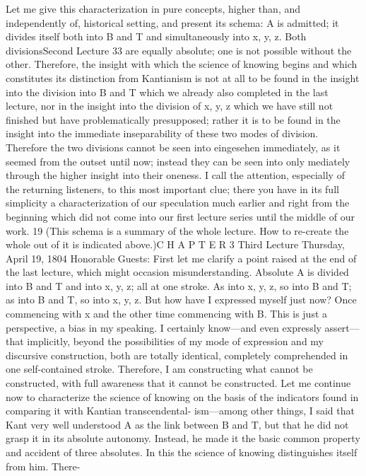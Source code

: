 Let me give this characterization in pure concepts, higher than, and
independently of, historical setting, and present its schema: A is admitted; it
divides itself both into B and T and simultaneously into x, y, z. Both divisionsSecond Lecture
33
are equally absolute; one is not possible without the other. Therefore, the
insight with which the science of knowing begins and which constitutes its
distinction from Kantianism is not at all to be found in the insight into the
division into B and T which we already also completed in the last lecture, nor
in the insight into the division of x, y, z which we have still not finished but
have problematically presupposed; rather it is to be found in the insight into
the immediate inseparability of these two modes of division. Therefore the two
divisions cannot be seen into {eingesehen} immediately, as it seemed from the
outset until now; instead they can be seen into only mediately through the
higher insight into their oneness.
I call the attention, especially of the returning listeners, to this most
important clue; there you have in its full simplicity a characterization of our
speculation much earlier and right from the beginning which did not come
into our first lecture series until the middle of our work. 19
(This schema is a summary of the whole lecture. How to re-create the
whole out of it is indicated above.)C H A P T E R
3
Third Lecture
Thursday, April 19, 1804
Honorable Guests:
First let me clarify a point raised at the end of the last lecture, which might
occasion misunderstanding. Absolute A is divided into B and T and into x, y,
z; all at one stroke. As into x, y, z, so into B and T; as into B and T, so into x,
y, z. But how have I expressed myself just now? Once commencing with x and
the other time commencing with B. This is just a perspective, a bias in my
speaking. I certainly know—and even expressly assert—that implicitly, beyond
the possibilities of my mode of expression and my discursive construction,
both are totally identical, completely comprehended in one self-contained
stroke. Therefore, I am constructing what cannot be constructed, with full
awareness that it cannot be constructed.
Let me continue now to characterize the science of knowing on the
basis of the indicators found in comparing it with Kantian transcendental-
ism—among other things, I said that Kant very well understood A as the link
between B and T, but that he did not grasp it in its absolute autonomy.
Instead, he made it the basic common property and accident of three
absolutes. In this the science of knowing distinguishes itself from him. There-
